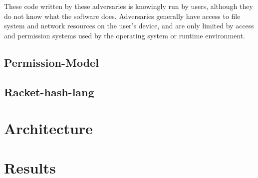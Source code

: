 These code written by these adversaries is knowingly run by users, although they do not know what the software does.  Adversaries generally have access to file system and network resources on the user's device, and are only limited by access and permission systems used by the operating system or runtime environment.

\subsection{Permission-Model}\label{section:Permssion-model}

\subsection{Racket-hash-lang}\label{section:racket}

\section{Architecture}\label{section:arch}

\section{Results}\label{section:results}

